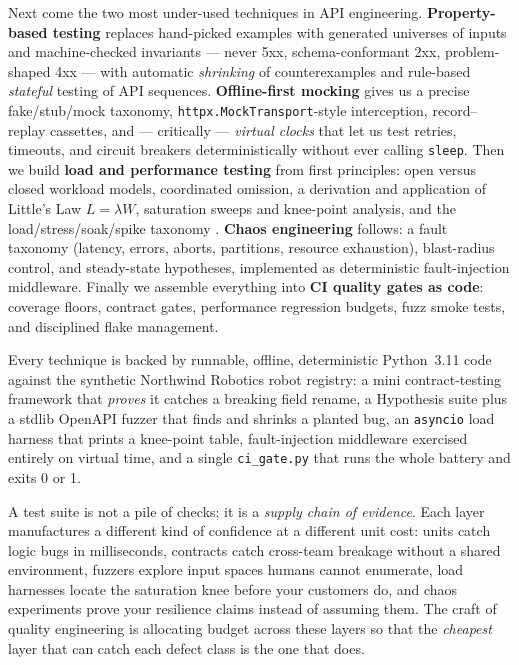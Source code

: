 Next come the two most under-used techniques in API engineering.
\textbf{Property-based testing} replaces hand-picked examples with
generated universes of inputs and machine-checked invariants --- never
5xx, schema-conformant 2xx, problem-shaped 4xx --- with automatic
\emph{shrinking} of counterexamples and rule-based \emph{stateful} testing
of API sequences. \textbf{Offline-first mocking} gives us a precise
fake/stub/mock taxonomy, \texttt{httpx.MockTransport}-style interception,
record--replay cassettes, and --- critically --- \emph{virtual clocks} that
let us test retries, timeouts, and circuit breakers deterministically
without ever calling \texttt{sleep}. Then we build \textbf{load and
performance testing} from first principles: open versus closed workload
models, coordinated omission, a derivation and application of Little's Law
$L = \lambda W$, saturation sweeps and knee-point analysis, and the
load/stress/soak/spike taxonomy \cite{nygard2018releaseit,beyer2016sre}.
\textbf{Chaos engineering} follows: a fault taxonomy (latency, errors,
aborts, partitions, resource exhaustion), blast-radius control, and
steady-state hypotheses, implemented as deterministic fault-injection
middleware. Finally we assemble everything into \textbf{CI quality gates as
code}: coverage floors, contract gates, performance regression budgets,
fuzz smoke tests, and disciplined flake management.

Every technique is backed by runnable, offline, deterministic Python~3.11
code against the synthetic Northwind Robotics robot registry: a mini
contract-testing framework that \emph{proves} it catches a breaking field
rename, a Hypothesis suite plus a stdlib OpenAPI fuzzer that finds and
shrinks a planted bug, an \texttt{asyncio} load harness that prints a
knee-point table, fault-injection middleware exercised entirely on virtual
time, and a single \texttt{ci\_gate.py} that runs the whole battery and
exits 0 or 1.

\begin{keyconceptbox}
A test suite is not a pile of checks; it is a \emph{supply chain of
evidence}. Each layer manufactures a different kind of confidence at a
different unit cost: units catch logic bugs in milliseconds, contracts
catch cross-team breakage without a shared environment, fuzzers explore
input spaces humans cannot enumerate, load harnesses locate the saturation
knee before your customers do, and chaos experiments prove your resilience
claims instead of assuming them. The craft of quality engineering is
allocating budget across these layers so that the \emph{cheapest} layer
that can catch each defect class is the one that does.
\end{keyconceptbox}

